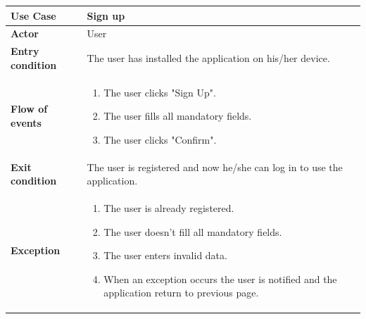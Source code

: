 \documentclass[../main.tex]{subfiles}
\begin{document}
	\begin{center}
		\begin{tabular}{p{3cm}p{8.28cm}}
			\hline
			\textbf{Use Case} & Sign up\\
			\hline
			\textbf{Actor} & User\\
			\hline
			\textbf{Entry condition} & The user has installed the application on his/her device.\\
			\hline
			\textbf{Flow of events} & \begin{enumerate}
				\linespread{0}\item The user clicks "Sign Up".
				\linespread{0}\item The user fills all mandatory fields.
				\linespread{0}\item The user clicks "Confirm".
			\end{enumerate}\\
			\hline
			\textbf{Exit condition} & The user is registered and now he/she can log in to use the application.\\
			\hline
			\textbf{Exception} & \begin{enumerate}
				\linespread{0}\item The user is already registered.
				\linespread{0}\item The user doesn't fill all mandatory fields.
				\linespread{0}\item The user enters invalid data.
				\linespread{0}\item When an exception occurs the user is notified and the application return to previous page.
			\end{enumerate}\\
			\hline
		\end{tabular}
	\end{center}
	\vspace*{3cm}
\end{document}

